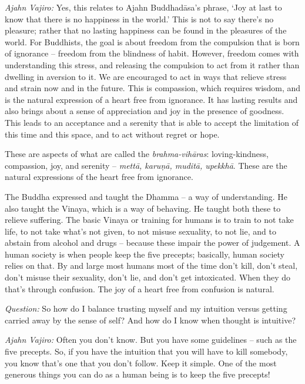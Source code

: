 \emph{Ajahn Vajiro:} Yes, this relates to Ajahn Buddhadāsa's phrase, `Joy at last to
know that there is no happiness in the world.' This is not to say there's no
pleasure; rather that no lasting happiness can be found in the pleasures of the world. For
Buddhists, the goal is about freedom from the compulsion that is born of
ignorance -- freedom from the blindness of habit. However, freedom comes with
understanding this stress, and releasing the compulsion to act from it rather
than dwelling in aversion to it. We are encouraged to act in ways that relieve
stress and strain now and in the future. This is compassion, which requires
wisdom, and is the natural expression of a heart free from ignorance. It has
lasting results and also brings about a sense of appreciation and joy in the
presence of goodness. This leads to an acceptance and a serenity that is able to
accept the limitation of this time and this space, and to act without regret or
hope.

These are aspects of what are called the \emph{brahma-vihāras}: loving-kindness,
compassion, joy, and serenity -- \emph{mettā, karuṇā, muditā, upekkhā}. These
are the natural expressions of the heart free from ignorance.

The Buddha expressed and taught the Dhamma -- a way of understanding. He also
taught the Vinaya, which is a way of behaving. He taught both these to relieve
suffering. The basic Vinaya or training for humans is to train to not take life, to not take
what's not given, to not misuse sexuality, to not lie, and to abstain
from alcohol and drugs -- because these impair the power of judgement. A human
society is when people keep the five precepts; basically, human society relies
on that. By and large most humans most of the time don't kill, don't steal, don't misuse their
sexuality, don't lie, and don't get intoxicated. When they do that's through
confusion. The joy of a heart free from confusion is natural.

\enlargethispage{\baselineskip}

\bigskip

\emph{Question:} So how do I balance trusting myself and my intuition versus getting
carried away by the sense of self? And how do I know when thought is intuitive?

\emph{Ajahn Vajiro:} Often you don't know. But you have some guidelines -- such as the
five precepts. So, if you have the intuition that you will have to kill
somebody, you know that's one that you don't follow. Keep it simple. One of the
most generous things you can do as a human being is to keep the five precepts!

